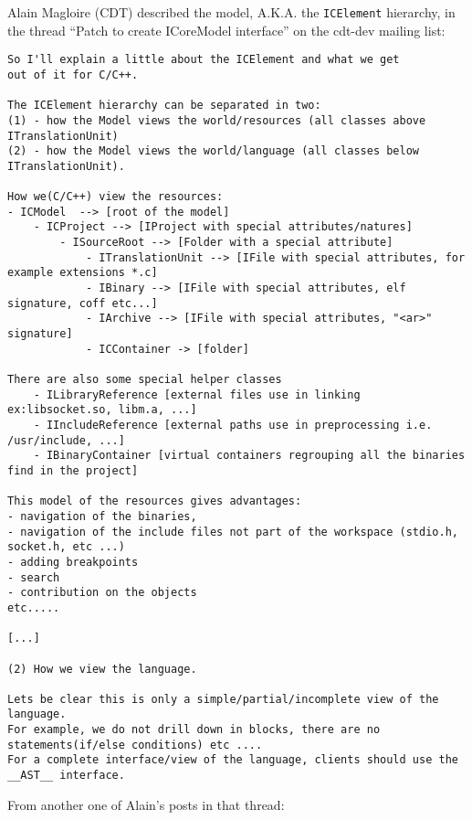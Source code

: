 Alain Magloire (CDT) described the model, A.K.A. the \texttt{ICElement}
hierarchy, in the thread
``Patch to create ICoreModel interface''
on the cdt-dev mailing list:

\begin{verbatim}
So I'll explain a little about the ICElement and what we get
out of it for C/C++.

The ICElement hierarchy can be separated in two:
(1) - how the Model views the world/resources (all classes above ITranslationUnit)
(2) - how the Model views the world/language (all classes below ITranslationUnit).

How we(C/C++) view the resources:
- ICModel  --> [root of the model]
    - ICProject --> [IProject with special attributes/natures]
        - ISourceRoot --> [Folder with a special attribute]
            - ITranslationUnit --> [IFile with special attributes, for example extensions *.c]
            - IBinary --> [IFile with special attributes, elf signature, coff etc...]
            - IArchive --> [IFile with special attributes, "<ar>" signature]
            - ICContainer -> [folder]

There are also some special helper classes
    - ILibraryReference [external files use in linking ex:libsocket.so, libm.a, ...]
    - IIncludeReference [external paths use in preprocessing i.e. /usr/include, ...]
    - IBinaryContainer [virtual containers regrouping all the binaries find in the project]

This model of the resources gives advantages:
- navigation of the binaries,
- navigation of the include files not part of the workspace (stdio.h, socket.h, etc ...)
- adding breakpoints
- search
- contribution on the objects
etc.....

[...]

(2) How we view the language.

Lets be clear this is only a simple/partial/incomplete view of the language.
For example, we do not drill down in blocks, there are no statements(if/else conditions) etc ....
For a complete interface/view of the language, clients should use the __AST__ interface.
\end{verbatim}

From another one of Alain's posts in that thread:

